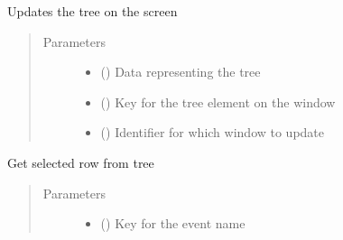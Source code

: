 \documentclass[letterpaper,10pt,english]{sphinxmanual}
\begin{document}
\begin{fulllineitems}
\begin{fulllineitems}
\label{\detokenize{interface:interface.Interface.update_tree}}
\sphinxAtStartPar
Updates the tree on the screen
\begin{quote}\begin{description}
\item[{Parameters}] \leavevmode\begin{itemize}
\item {} 
\sphinxAtStartPar
{} () \textendash{} Data representing the tree

\item {} 
\sphinxAtStartPar
{} () \textendash{} Key for the tree element on the window

\item {} 
\sphinxAtStartPar
{} (\sphinxstyleliteralemphasis{\sphinxupquote{, }}) \textendash{} Identifier for which window to update

\end{itemize}

\end{description}\end{quote}

\end{fulllineitems}


\begin{fulllineitems}
\label{\detokenize{interface:interface.Interface.write_event}}
\sphinxAtStartPar
Get selected row from tree
\begin{quote}\begin{description}
\item[{Parameters}] \leavevmode\begin{itemize}
\item {} 
\sphinxAtStartPar
{} () \textendash{} Key for the event name


\end{itemize}
\end{description}
\end{quote}
\end{fulllineitems}
\end{fulllineitems}
\end{document}
